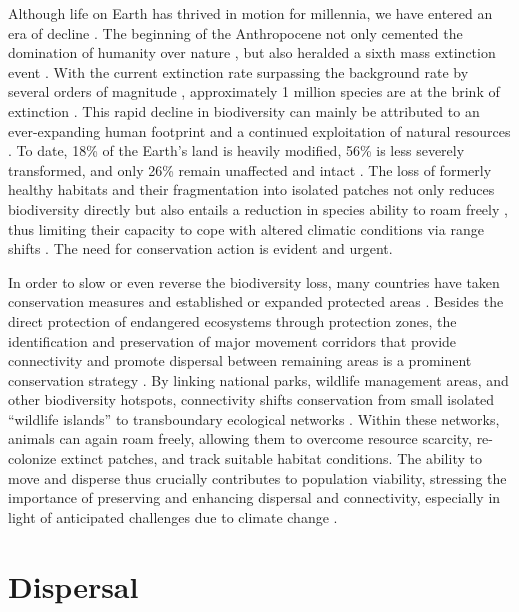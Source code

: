 \documentclass[../FinalThesis.tex]{subfiles}
\begin{document}
Although life on Earth has thrived in motion for millennia, we have entered an
era of decline \citep{IPBES.2019, Almond.2022}. The beginning of the
Anthropocene \citep{Crutzen.2006} not only cemented the domination of humanity
over nature \citep{Kareiva.2007, Johns.2022}, but also heralded a sixth mass
extinction event \citep{Barnosky.2011, Ceballos.2015}. With the current
extinction rate surpassing the background rate by several orders of magnitude
\citep{Ceballos.2015, Ceballos.2017}, approximately 1 million species are at the
brink of extinction \citep{IPBES.2019}. This rapid decline in biodiversity can
mainly be attributed to an ever-expanding human footprint and a continued
exploitation of natural resources \citep{Venter.2016, Ceballos.2017}. To date,
18\% of the Earth's land is heavily modified, 56\% is less severely transformed,
and only 26\% remain unaffected and intact \citep{Locke.2019}. The loss of
formerly healthy habitats and their fragmentation into isolated patches not only
reduces biodiversity directly but also entails a reduction in species ability to
roam freely \citep{Haddad.2015}, thus limiting their capacity to cope with
altered climatic conditions via range shifts \citep{Fahrig.2003, Heller.2009,
Chen.2011, Tucker.2018}. The need for conservation action is evident and urgent.

In order to slow or even reverse the biodiversity loss, many countries have
taken conservation measures and established or expanded protected areas
\citep{Bingham.2021}. Besides the direct protection of endangered ecosystems
through protection zones, the identification and preservation of major movement
corridors that provide connectivity and promote dispersal between remaining
areas is a prominent conservation strategy \citep{Fahrig.2003, Doerr.2011,
Rudnick.2012}. By linking national parks, wildlife management areas, and other
biodiversity hotspots, connectivity shifts conservation from small isolated
``wildlife islands'' to transboundary ecological networks \citep{Hilty.2020}.
Within these networks, animals can again roam freely, allowing them to overcome
resource scarcity, re-colonize extinct patches, and track suitable habitat
conditions. The ability to move and disperse thus crucially contributes to
population viability, stressing the importance of preserving and enhancing
dispersal and connectivity, especially in light of anticipated challenges due to
climate change \citep{Heller.2009}.

\section{Dispersal}
\end{document}
